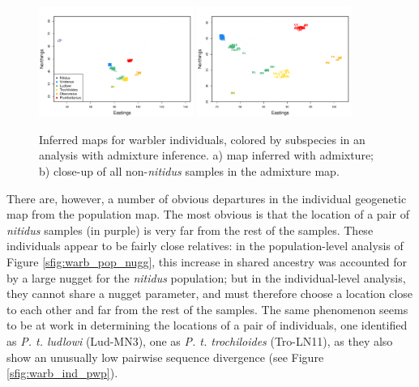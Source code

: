 \documentclass[12pt]{article}
\begin{document}
\begin{figure}
	\centering
			{\includegraphics[width=0.45\textwidth,height=0.37\textwidth]{figs/warblers/individual_warbler_map_arrows_randpr2.pdf}}
			{\includegraphics[width=0.45\textwidth,height=0.37\textwidth]{figs/warblers/individual_warbler_map_arrows_randpr2_closeup.pdf}}
	\caption{
    Inferred maps for warbler individuals, colored by subspecies in an analysis with admixture inference. 
    a) map inferred with admixture; b) close-up of all non-\textit{nitidus} samples in the admixture map.
}\label{sfig:warbler_ind_maps}
\end{figure}

There are, however, a number of obvious departures in the individual geogenetic map from the population map.  The most obvious is that the location of a pair of \textit{nitidus} samples (in purple) is very far from the rest of the samples.  
These individuals appear to be fairly close relatives:
in the population-level analysis of Figure \ref{sfig:warb_pop_nugg},
this increase in shared ancestry was accounted for by a large nugget for the \textit{nitidus} population;
but in the individual-level analysis, they cannot share a nugget parameter, 
and must therefore choose a location close to each other and far from the rest of the samples.
The same phenomenon seems to be at work in determining the locations of a pair of individuals, one identified as \textit{P. t. ludlowi} (Lud-MN3), one as \textit{P. t. trochiloides} (Tro-LN11), 
as they also show an unusually low pairwise sequence divergence (see Figure \ref{sfig:warb_ind_pwp}).
\end{document}
